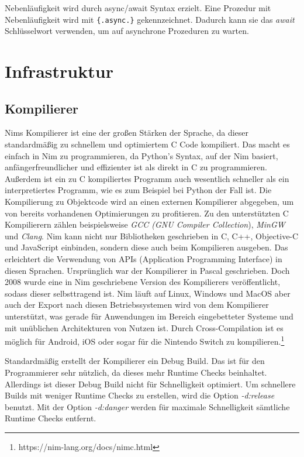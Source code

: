 \documentclass[11pt]{report}
\begin{document}
Nebenläufigkeit wird durch async/await Syntax erzielt. Eine Prozedur mit Nebenläufigkeit wird mit \verb|{.async.}| gekennzeichnet. Dadurch kann sie das \emph{await} Schlüsselwort verwenden, um auf asynchrone Prozeduren zu warten.


\section{Infrastruktur}
\subsection{Kompilierer}
Nims Kompilierer ist eine der großen Stärken der Sprache, da dieser standardmäßig zu schnellem und optimiertem C Code kompiliert. Das macht es einfach in Nim zu programmieren, da Python's Syntax, auf der Nim basiert, anfängerfreundlicher und effizienter ist als direkt in C zu programmieren.
Außerdem ist ein zu C kompiliertes Programm auch wesentlich schneller als ein interpretiertes Programm, wie es zum Beispiel bei Python der Fall ist.
Die Kompilierung zu Objektcode wird an einen externen Kompilierer abgegeben, um von bereits vorhandenen Optimierungen zu profitieren. Zu den unterstützten C Kompilierern zählen beispielsweise \emph{GCC (GNU Compiler Collection}), \emph{MinGW} und \emph{Clang}. Nim kann nicht nur Bibliotheken geschrieben in C, C++, Objective-C und JavaScript einbinden, sondern diese auch beim Kompilieren ausgeben. Das erleichtert die Verwendung von APIs (Application Programming Interface) in diesen Sprachen.
Ursprünglich war der Kompilierer in Pascal geschrieben. Doch 2008 wurde eine in Nim geschriebene Version des Kompilierers veröffentlicht, sodass dieser selbsttragend ist. Nim läuft auf Linux, Windows und MacOS aber auch der Export nach diesen Betriebssystemen wird von dem Kompilierer unterstützt, was gerade für Anwendungen im Bereich eingebetteter Systeme und mit unüblichen Architekturen von Nutzen ist.
Durch Cross-Compilation ist es möglich für Android, iOS oder sogar für die Nintendo Switch zu kompilieren.\footnote{https://nim-lang.org/docs/nimc.html}

Standardmäßig erstellt der Kompilierer ein Debug Build. Das ist für den Programmierer sehr nützlich, da dieses mehr Runtime Checks beinhaltet. Allerdings ist dieser Debug Build nicht für Schnelligkeit optimiert. Um schnellere Builds mit weniger Runtime Checks zu erstellen, wird die Option \emph{-d:release} benutzt. Mit der Option \emph{-d:danger} werden für maximale Schnelligkeit sämtliche Runtime Checks entfernt.
\end{document}
